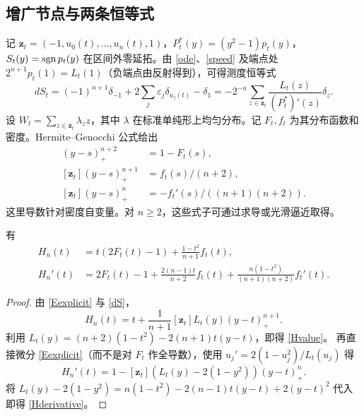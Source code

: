 \documentclass[11pt,a4paper,fontset=fandol]{ctexart}
\begin{document}
\subsection{增广节点与两条恒等式}
记 $\boldsymbol z_t=(-1,u_0(t),\ldots,u_n(t),1)$，$P_t^*(y)=(y^2-1)p_t(y)$，$S_t(y)=\operatorname{sgn} p_t(y)$ 在区间外零延拓。由 \eqref{ode}、\eqref{speed} 及端点处 $2^{n+1}p_t(1)=L_t(1)$（负端点由反射得到），可得测度恒等式
\begin{equation}\label{dS}
 dS_t=(-1)^{n+1}\delta_{-1}+2\sum_j\varepsilon_j\delta_{u_j(t)}-\delta_1
 =-2^{-n}\sum_{z\in\boldsymbol z_t}\frac{L_t(z)}{(P_t^*)'(z)}\delta_z.
\end{equation}
设 $W_t=\sum_{z\in\boldsymbol z_t}\lambda_z z$，其中 $\lambda$ 在标准单纯形上均匀分布。记 $F_t,f_t$ 为其分布函数和密度。Hermite--Genocchi 公式给出
\begin{align*}
[\boldsymbol z_t](y-s)_+^{n+2}&=1-F_t(s),\\
[\boldsymbol z_t](y-s)_+^{n+1}&=f_t(s)/(n+2),\\
[\boldsymbol z_t](y-s)_+^{n}&=-f_t'(s)/((n+1)(n+2)).
\end{align*}
这里导数针对密度自变量。对 $n\ge2$，这些式子可通过求导或光滑逼近取得。
\begin{lemma}\label{lem:identities}
有
\begin{align}
H_n(t)&=t(2F_t(t)-1)+\frac{1-t^2}{n+1}f_t(t),\label{Hvalue}\\
H_n'(t)&=2F_t(t)-1+\frac{2(n-1)t}{n+2}f_t(t)
 +\frac{n(1-t^2)}{(n+1)(n+2)}f_t'(t).\label{Hderivative}
\end{align}
\end{lemma}
\begin{proof}
由 \eqref{Eexplicit} 与 \eqref{dS}，
\[H_n(t)=t+\frac1{n+1}[\boldsymbol z_t]L_t(y)(y-t)_+^{n+1}.\]
利用 $L_t(y)=(n+2)(1-t^2)-2(n+1)t(y-t)$，即得 \eqref{Hvalue}。
再直接微分 \eqref{Eexplicit}（而不是对 $F_t$ 作全导数），使用 $u_j'=2(1-u_j^2)/L_t(u_j)$ 得
\[H_n'(t)=1-[\boldsymbol z_t](L_t(y)-2(1-y^2))(y-t)_+^n.\]
将 $L_t(y)-2(1-y^2)=n(1-t^2)-2(n-1)t(y-t)+2(y-t)^2$ 代入即得 \eqref{Hderivative}。
\end{proof}
\end{document}
